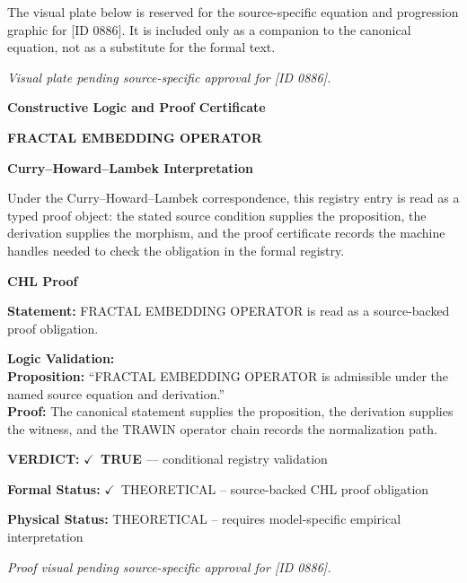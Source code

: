 \begingroup\footnotesize\sloppy
The visual plate below is reserved for the source-specific equation and progression graphic for [ID 0886]. It is included only as a companion to the canonical equation, not as a substitute for the formal text.
\par\endgroup
\begingroup\footnotesize\itshape
Visual plate pending source-specific approval for [ID 0886].
\par\endgroup

\clearpage
\begingroup\tzpsupportsetup
\noindent\textbf{\fontsize{10.8pt}{12.8pt}\selectfont [ID 0886] Constructive Logic and Proof Certificate}\par
\noindent\textbf{\fontsize{10pt}{12pt}\selectfont FRACTAL EMBEDDING OPERATOR}\par
\vspace{0.45em}
\begingroup
\footnotesize
\setlength{\parskip}{0.22em}
\setlength{\parindent}{0pt}
\noindent\textbf{Curry--Howard--Lambek Interpretation}\par
Under the Curry--Howard--Lambek correspondence, this registry entry is read as a typed proof
object: the stated source condition supplies the proposition, the derivation supplies the
morphism, and the proof certificate records the machine handles needed to check the obligation
in the formal registry.

\vspace{0.45em}
\noindent\textbf{CHL Proof}\par
\textbf{Statement:} FRACTAL EMBEDDING OPERATOR is read as a source-backed proof obligation.

\textbf{Logic Validation:}\\
\textbf{Proposition:} ``FRACTAL EMBEDDING OPERATOR is admissible under the named source equation and derivation.''\\
\textbf{Proof:} The canonical statement supplies the proposition, the derivation supplies the witness, and the TRAWIN operator chain records the normalization path.

\textbf{VERDICT:} \ensuremath{\checkmark}\ \textbf{TRUE} --- conditional registry validation

\textbf{Formal Status:} \ensuremath{\checkmark}\ THEORETICAL -- source-backed CHL proof obligation

\textbf{Physical Status:} THEORETICAL -- requires model-specific empirical interpretation
\par\vspace{0.45em}
\par
\vfill
\begingroup\footnotesize\itshape
Proof visual pending source-specific approval for [ID 0886].
\par\endgroup
\vfill
\endgroup
\endgroup
